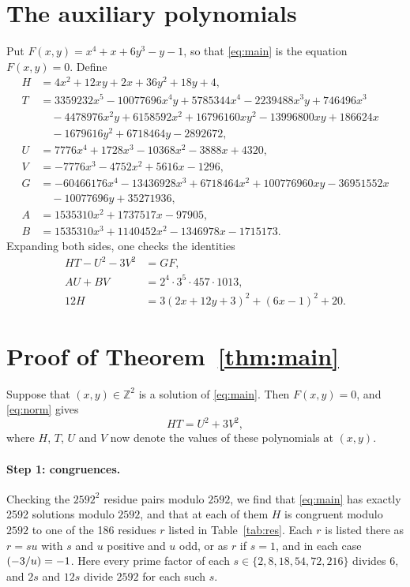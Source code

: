 \documentclass[11pt]{article}
\newcommand{\Z}{\mathbb{Z}}
\newcommand{\leg}[2]{\mathchoice{\biggl(\dfrac{#1}{#2}\biggr)}{(#1/#2)}{(#1/#2)}{(#1/#2)}}
\begin{document}
\section{The auxiliary polynomials}

Put $F(x,y)=x^{4}+x+6y^{3}-y-1$, so that \eqref{eq:main} is the equation $F(x,y)=0$. Define
\begin{align*}
H&=4x^{2}+12xy+2x+36y^{2}+18y+4,\\
T&=3359232x^{5}-10077696x^{4}y+5785344x^{4}-2239488x^{3}y+746496x^{3}\\
&\quad-4478976x^{2}y+6158592x^{2}+16796160xy^{2}-13996800xy+186624x\\
&\quad-1679616y^{2}+6718464y-2892672,\\
U&=7776x^{4}+1728x^{3}-10368x^{2}-3888x+4320,\\
V&=-7776x^{3}-4752x^{2}+5616x-1296,\\
G&=-60466176x^{4}-13436928x^{3}+6718464x^{2}+100776960xy-36951552x\\
&\quad-10077696y+35271936,\\
A&=1535310x^{2}+1737517x-97905,\\
B&=1535310x^{3}+1140452x^{2}-1346978x-1715173.
\end{align*}
Expanding both sides, one checks the identities
\begin{align}
HT-U^2-3V^2&=GF,\label{eq:norm}\\
AU+BV&=2^{4}\cdot 3^{5}\cdot 457\cdot 1013,\label{eq:bezout}\\
12H&=3(2x+12y+3)^2+(6x-1)^2+20.\label{eq:sign}
\end{align}

\section{Proof of Theorem~\ref{thm:main}}

Suppose that $(x,y)\in\Z^2$ is a solution of \eqref{eq:main}. Then $F(x,y)=0$, and \eqref{eq:norm} gives
\begin{equation}\label{eq:HT}
HT=U^2+3V^2,
\end{equation}
where $H$, $T$, $U$ and $V$ now denote the values of these polynomials at $(x,y)$.

\paragraph{Step 1: congruences.} Checking the $2592^2$ residue pairs modulo $2592$, we find that \eqref{eq:main} has exactly 2592 solutions modulo $2592$, and that at each of them $H$ is congruent modulo $2592$ to one of the 186 residues $r$ listed in Table~\ref{tab:res}. Each $r$ is listed there as $r=su$ with $s$ and $u$ positive and $u$ odd, or as $r$ if $s=1$, and in each case $\leg{-3}{u}=-1$. Here every prime factor of each $s\in\{2,8,18,54,72,216\}$ divides $6$, and $2s$ and $12s$ divide $2592$ for each such $s$.
\end{document}
